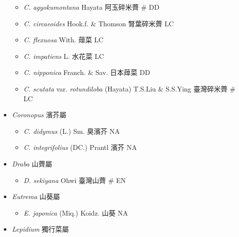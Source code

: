\begin{itemize}
  \begin{itemize}
        \item[] \textit{C. agyokumontana} Hayata  阿玉碎米薺  \# DD
        \item[] \textit{C. circaeoides} Hook.f. \& Thomson  腎葉碎米薺   LC
        \item[] \textit{C. flexuosa} With.  蔊菜   LC
        \item[] \textit{C. impatiens} L.  水花菜   LC
        \item[] \textit{C. nipponica} Franch. \& Sav.  日本蔊菜   DD
        \item[] \textit{C. scutata} var. \textit{rotundiloba} (Hayata) T.S.Liu \& S.S.Ying  臺灣碎米薺  \# LC
  \end{itemize}
 \item[] \textit{Coronopus} 濱芥屬
                                
  \begin{itemize}
        \item[] \textit{C. didymus} (L.) Sm.  臭濱芥   NA
        \item[] \textit{C. integrifolius} (DC.) Prantl  濱芥   NA
  \end{itemize}
 \item[] \textit{Draba} 山薺屬
                                
  \begin{itemize}
        \item[] \textit{D. sekiyana} Ohwi  臺灣山薺  \# EN
  \end{itemize}
 \item[] \textit{Eutrema} 山葵屬
                                
  \begin{itemize}
        \item[] \textit{E. japonica} (Miq.) Koidz.  山葵   NA
  \end{itemize}
 \item[] \textit{Lepidium} 獨行菜屬
                                

\end{itemize}
